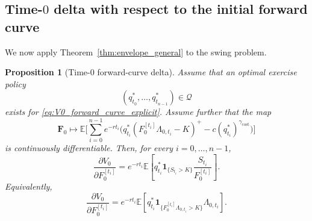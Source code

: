 \documentclass[10pt,a4paper,reqno]{amsart}
\newcommand{\<}{\langle}
\renewcommand{\>}{\rangle}
\newtheorem{proposition}[theorem]{Proposition}
\theoremstyle{example}
\begin{document}
\subsection{Time-$0$ delta with respect to the initial forward curve}

We now apply Theorem~\ref{thm:envelope_general} to the swing problem.

\begin{proposition}[Time-$0$ forward-curve delta]
\label{prop:time0_delta}
Assume that an optimal exercise policy
\[
(q_{t_0}^*,\dots,q_{t_{n-1}}^*) \in \mathcal{Q}
\]
exists for \eqref{eq:V0_forward_curve_explicit}. Assume further that the map
\[
\mathbf{F}_0
\longmapsto
\mathbb{E}\!\Bigg[
\sum_{i=0}^{n-1}
e^{-r t_i}
\Big(
q_{t_i}^*(F_0^{[t_i]}\Lambda_{0,t_i}-K)^+
-
c (q_{t_i}^*)^{\gamma_{\mathrm{cost}}}
\Big)
\Bigg]
\]
is continuously differentiable. Then, for every $i=0,\dots,n-1$,
\begin{equation}
\label{eq:time0_delta_main}
\frac{\partial V_0}{\partial F_0^{[t_i]}}
=
e^{-r t_i}
\mathbb{E}\!\left[
q_{t_i}^*
\mathbf{1}_{\{S_{t_i}>K\}}
\frac{S_{t_i}}{F_0^{[t_i]}}
\right].
\end{equation}
Equivalently,
\begin{equation}
\label{eq:time0_delta_main_alt}
\frac{\partial V_0}{\partial F_0^{[t_i]}}
=
e^{-r t_i}
\mathbb{E}\!\left[
q_{t_i}^*
\mathbf{1}_{\{F_0^{[t_i]}\Lambda_{0,t_i}>K\}}
\Lambda_{0,t_i}
\right].
\end{equation}
\end{proposition}
\end{document}
